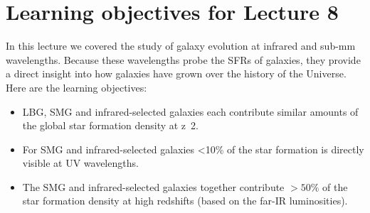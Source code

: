 \documentclass[11pt]{article}
\begin{document}
\section{Learning objectives for Lecture 8}
In this lecture we covered the study of galaxy evolution at infrared
and sub-mm wavelengths. Because these wavelengths probe the SFRs of
galaxies, they provide a direct insight into how galaxies have grown
over the history of the Universe. Here are the learning objectives:
\begin{itemize}
\item LBG, SMG and infrared-selected galaxies each contribute similar
  amounts of the global star formation density at z~2.
\item For SMG and infrared-selected galaxies <10\% of the star
  formation is directly visible at UV wavelengths.
\item The SMG and infrared-selected galaxies together contribute
  $>50\%$ of the star formation density at high redshifts (based on
  the far-IR luminosities).
\end{itemize}
\end{document}
